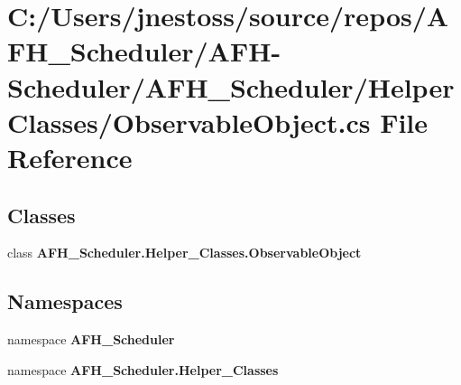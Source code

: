 \section{C\+:/\+Users/jnestoss/source/repos/\+A\+F\+H\+\_\+\+Scheduler/\+A\+F\+H-\/\+Scheduler/\+A\+F\+H\+\_\+\+Scheduler/\+Helper\+Classes/\+Observable\+Object.cs File Reference}
\label{_observable_object_8cs}
\subsection*{Classes}
\begin{DoxyCompactItemize}
\item 
class \textbf{ A\+F\+H\+\_\+\+Scheduler.\+Helper\+\_\+\+Classes.\+Observable\+Object}
\end{DoxyCompactItemize}
\subsection*{Namespaces}
\begin{DoxyCompactItemize}
\item 
namespace \textbf{ A\+F\+H\+\_\+\+Scheduler}
\item 
namespace \textbf{ A\+F\+H\+\_\+\+Scheduler.\+Helper\+\_\+\+Classes}
\end{DoxyCompactItemize}
